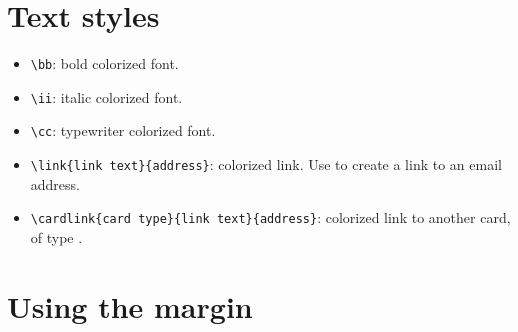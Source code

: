 \documentclass{knowledge-cards}
\begin{document}
\section{Text styles}
 
%
\begin{itemize}
\item {\color{\cardtype}\verb|\bb|}: bold colorized font.
\item {\color{\cardtype}\verb|\ii|}: italic colorized font.
\item {\color{\cardtype}\verb|\cc|}: typewriter colorized font.
\item {\color{\cardtype}\verb|\link{link text}{address}|}: colorized link. Use
 to create a link to an email address.
\item {\color{\cardtype}\verb|\cardlink{card type}{link text}{address}|}: colorized link to another card, of type .  
\end{itemize}
%

\section{Using the margin}
 
\end{document}
